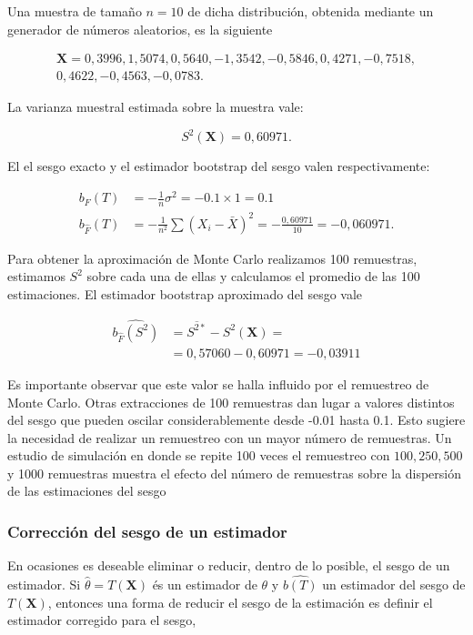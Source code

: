 \documentclass[
]{article}
\begin{document}
Una muestra de tamaño \(n=10\) de dicha distribución, obtenida mediante un generador de números aleatorios, es la siguiente

\[
\begin{gathered}
\mathbf{X}=0,3996,1,5074,0,5640,-1,3542,-0,5846,0,4271,-0,7518, \\
0,4622,-0,4563,-0,0783 .
\end{gathered}
\]

La varianza muestral estimada sobre la muestra vale:

\[
S^{2}(\mathbf{X})=0,60971 .
\]

El el sesgo exacto y el estimador bootstrap del sesgo valen respectivamente:

\[
\begin{aligned}
b_{F}(T) & =-\frac{1}{n} \sigma^{2}=-0.1 \times 1=0.1 \\
b_{\hat{F}}(T) & =-\frac{1}{n^{2}} \sum\left(X_{i}-\bar{X}\right)^{2}=-\frac{0,60971}{10}=-0,060971 .
\end{aligned}
\]

Para obtener la aproximación de Monte Carlo realizamos 100 remuestras, estimamos \(S^{2}\) sobre cada una de ellas y calculamos el promedio de las 100 estimaciones. El estimador bootstrap aproximado del sesgo vale

\[
\begin{aligned}
\widehat{b_{\hat{F}}\left(S^{2}\right)} & =\overline{S^{2 *}}-S^{2}(\mathbf{X})= \\
& =0,57060-0,60971=-0,03911
\end{aligned}
\]

Es importante observar que este valor se halla influido por el remuestreo de Monte Carlo. Otras extracciones de 100 remuestras dan lugar a valores distintos del sesgo que pueden oscilar considerablemente desde -0.01 hasta 0.1. Esto sugiere la necesidad de realizar un remuestreo con un mayor número de remuestras. Un estudio de simulación en donde se repite 100 veces el remuestreo con \(100,250,500\) y 1000 remuestras muestra el efecto del número de remuestras sobre la dispersión de las estimaciones del sesgo

\subsubsection{Corrección del sesgo de un estimador}\label{correcciuxf3n-del-sesgo-de-un-estimador}

En ocasiones es deseable eliminar o reducir, dentro de lo posible, el sesgo de un estimador. Si \(\hat{\theta}=T(\mathbf{X})\) és un estimador de \(\theta\) y \(\widehat{b(T)}\) un estimador del sesgo de \(T(\mathbf{X})\), entonces una forma de reducir el sesgo de la estimación es definir el estimador corregido para el sesgo,
\end{document}
